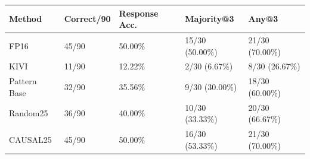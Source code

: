\begin{tabular}{lllll}
\toprule
Method & Correct/90 & Response Acc. & Majority@3 & Any@3 \\
\midrule
FP16 & 45/90 & 50.00\% & 15/30 (50.00\%) & 21/30 (70.00\%) \\
KIVI & 11/90 & 12.22\% & 2/30 (6.67\%) & 8/30 (26.67\%) \\
Pattern Base & 32/90 & 35.56\% & 9/30 (30.00\%) & 18/30 (60.00\%) \\
Random25 & 36/90 & 40.00\% & 10/30 (33.33\%) & 20/30 (66.67\%) \\
CAUSAL25 & 45/90 & 50.00\% & 16/30 (53.33\%) & 21/30 (70.00\%) \\
\bottomrule
\end{tabular}
